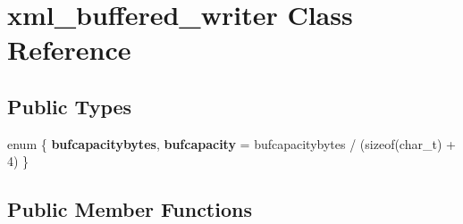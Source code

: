 \hypertarget{classxml__buffered__writer}{\section{xml\-\_\-buffered\-\_\-writer Class Reference}
\label{classxml__buffered__writer}
}
\subsection*{Public Types}
\begin{DoxyCompactItemize}
\item 
enum \{ {\bfseries bufcapacitybytes}, 
{\bfseries bufcapacity} = bufcapacitybytes / (sizeof(char\-\_\-t) + 4)
 \}
\end{DoxyCompactItemize}
\subsection*{Public Member Functions}
